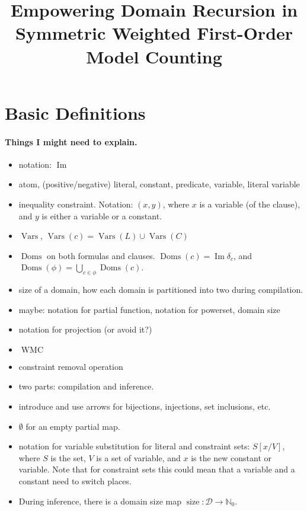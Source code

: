 \documentclass{article}
\title{Empowering Domain Recursion in Symmetric Weighted First-Order Model Counting}
\theoremstyle{definition}
\DeclareMathOperator{\Imm}{Im}
\DeclareMathOperator{\Doms}{Doms}
\DeclareMathOperator{\size}{size}
\DeclareMathOperator{\Vars}{Vars}
\DeclareMathOperator{\WMC}{WMC}
\begin{document}
\maketitle

\section{Basic Definitions}

\paragraph{Things I might need to explain.}
\begin{itemize}
\item notation: $\Imm$
\item atom, (positive/negative) literal, constant, predicate, variable, literal variable
\item inequality constraint. Notation: $(x, y)$, where $x$ is a variable (of the clause), and $y$ is either a variable or a constant.
\item $\Vars$, $\Vars(c) = \Vars(L) \cup \Vars(C)$
\item $\Doms$ on both formulas and clauses. $\Doms(c) = \Imm \delta_c$, and $\Doms(\phi) = \bigcup_{c \in \phi} \Doms(c)$.
\item size of a domain, how each domain is partitioned into two during compilation.
\item maybe: notation for partial function, notation for powerset, domain size
\item notation for projection (or avoid it?)
\item $\WMC$
\item constraint removal operation
\item two parts: compilation and inference.
\item introduce and use arrows for bijections, injections, set inclusions, etc.
\item $\emptyset$ for an empty partial map.
\item notation for variable substitution for literal and constraint sets: $S[x/V]$, where $S$ is the set, $V$ is a set of variable, and $x$ is the new constant or variable. Note that for constraint sets this could mean that a variable and a constant need to switch places.
\item During inference, there is a domain size map $\size\colon \mathscr{D} \to \mathbb{N}_0$.
\end{itemize}
\end{document}
